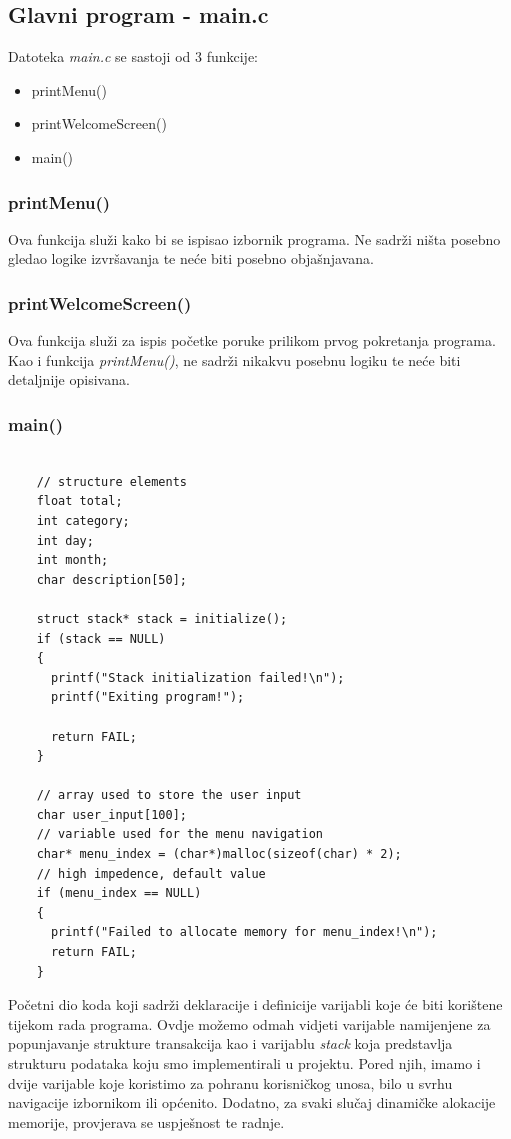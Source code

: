\documentclass[12pt, letterpaper]{article}
\begin{document}
  \subsection{Glavni program - main.c}
  Datoteka \textit{main.c} se sastoji od 3 funkcije:
  \begin{itemize}
    \item printMenu()
    \item printWelcomeScreen()
    \item main()
  \end{itemize}

  \subsubsection{printMenu()}
    Ova funkcija služi kako bi se ispisao izbornik programa. Ne sadrži ništa posebno gledao logike izvršavanja te neće biti posebno objašnjavana. 

  \subsubsection{printWelcomeScreen()}
    Ova funkcija služi za ispis početke poruke prilikom prvog pokretanja programa. Kao i funkcija \textit{printMenu()}, ne sadrži nikakvu posebnu logiku te neće biti detaljnije opisivana.

  \subsubsection{main()}
     \begin{verbatim}

    // structure elements
    float total;
    int category;
    int day;
    int month;
    char description[50];

    struct stack* stack = initialize();
    if (stack == NULL)
    {
      printf("Stack initialization failed!\n");
      printf("Exiting program!");

      return FAIL;
    }

    // array used to store the user input
    char user_input[100];
    // variable used for the menu navigation
    char* menu_index = (char*)malloc(sizeof(char) * 2); 
    // high impedence, default value
    if (menu_index == NULL)
    {
      printf("Failed to allocate memory for menu_index!\n");
      return FAIL;
    }   
    \end{verbatim}
    Početni dio koda koji sadrži deklaracije i definicije varijabli koje će biti korištene tijekom rada programa. Ovdje možemo odmah vidjeti varijable namijenjene za popunjavanje strukture transakcija kao i varijablu \textit{stack} koja predstavlja strukturu podataka koju smo implementirali u projektu. Pored njih, imamo i dvije varijable koje koristimo za pohranu korisničkog unosa, bilo u svrhu navigacije izbornikom ili općenito. Dodatno, za svaki slučaj dinamičke alokacije memorije, provjerava se uspješnost te radnje.
\end{document}
